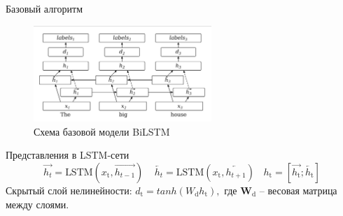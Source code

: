 \documentclass{beamer}
\begin{document}
			\begin{frame}{Базовый алгоритм}
				\begin{figure}[H]
					\centering
					\includegraphics[width=0.60\textwidth]{./pics/BiLSTM}
					\caption{Схема базовой модели BiLSTM}
				\end{figure}
				\begin{block}{ Представления в LSTM-сети} 
					$$\overrightarrow{h_t} = \text{LSTM}(x_\text{t}, \overrightarrow{h_{t-1}})~~~~~
					\overleftarrow{h_t} = \text{LSTM}(x_\text{t}, \overleftarrow{h_{t+1}})~~~~
					h_\text{t} = [\overrightarrow{h_\text{t}};\overleftarrow{h_\text{t}}]$$
					Скрытый слой нелинейности:
					$d_\text{t} = tanh(W_\text{d}h_\text{t}),$
					где $\textbf{W}_\text{d}$ -- весовая матрица между слоями.
				\end{block}
			\end{frame}
	
\end{document}
